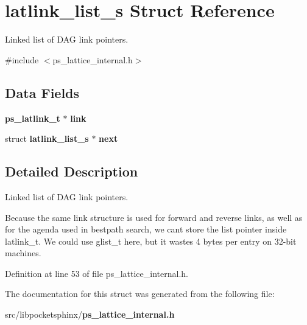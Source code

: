 \section{latlink\+\_\+list\+\_\+s Struct Reference}
\label{structlatlink__list__s}


Linked list of D\+A\+G link pointers.  




{\ttfamily \#include $<$ps\+\_\+lattice\+\_\+internal.\+h$>$}

\subsection*{Data Fields}
\begin{DoxyCompactItemize}
\item 
{\bf ps\+\_\+latlink\+\_\+t} $\ast$ {\bfseries link}\label{structlatlink__list__s_accd8f5fdb23871b66b81c830e3808068}

\item 
struct {\bf latlink\+\_\+list\+\_\+s} $\ast$ {\bfseries next}\label{structlatlink__list__s_a17b319bb0f536542267496afecc8de10}

\end{DoxyCompactItemize}


\subsection{Detailed Description}
Linked list of D\+A\+G link pointers. 

Because the same link structure is used for forward and reverse links, as well as for the agenda used in bestpath search, we can\textquotesingle{}t store the list pointer inside latlink\+\_\+t. We could use glist\+\_\+t here, but it wastes 4 bytes per entry on 32-\/bit machines. 

Definition at line 53 of file ps\+\_\+lattice\+\_\+internal.\+h.



The documentation for this struct was generated from the following file\+:\begin{DoxyCompactItemize}
\item 
src/libpocketsphinx/{\bf ps\+\_\+lattice\+\_\+internal.\+h}\end{DoxyCompactItemize}
